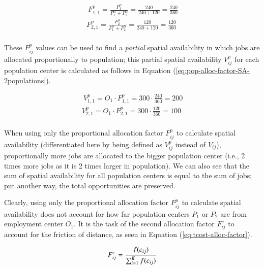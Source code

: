 \documentclass[]{elsarticle} %
\begin{document}
\begin{equation}
\label{eq:pop-alloc-factor-2populations}
\begin{array}{l}\
F^p_{1,1} = \frac{P_1 ^\alpha}{P_1^\alpha + P_2^\alpha} = \frac{240}{240 + 120} = \frac{240}{360}\\
F^p_{2,1} = \frac{P_2^\alpha}{P_1^\alpha + P_2^\alpha}  = \frac{120}{240 + 120} = \frac{120}{360}\\
\end{array}
\end{equation}

These \(F^p_{ij}\) values can be used to find a \emph{partial} spatial
availability in which jobs are allocated proportionally to population;
this partial spatial availability \(V^p_{ij}\) for each population
center is calculated as follows in Equation
(\ref{eq:pop-alloc-factor-SA-2populations}).

\begin{equation}
\label{eq:pop-alloc-factor-SA-2populations}
\begin{array}{l}\
V^p_{1,1} = O_1 \cdot F^p_{1,1} = 300 \cdot \frac{240}{360} = 200 \\
V^p_{2,1} = O_1 \cdot F^p_{2,1} = 300 \cdot \frac{120}{360} = 100 \\
\end{array}
\end{equation}

When using only the proportional allocation factor \(F^p_{ij}\) to
calculate spatial availability (differentiated here by being defined as
\(V^p_{ij}\) instead of \(V_{ij}\)), proportionally more jobs are
allocated to the bigger population center (i.e., 2 times more jobs as it
is 2 times larger in population). We can also see that the sum of
spatial availability for all population centers is equal to the sum of
jobs; put another way, the total opportunities are preserved.

Clearly, using only the proportional allocation factor \(F^p_{ij}\) to
calculate spatial availability does not account for how far population
centers \(P_1\) or \(P_2\) are from employment center \(O_1\). It is the
task of the second allocation factor \(F^c_{ij}\) to account for the
friction of distance, as seen in Equation (\ref{eq:tcost-alloc-factor}).

\begin{equation}
\label{eq:tcost-alloc-factor}
F^c_{ij} = \frac{f(c_{ij})}{\sum_{i=1}^K f(c_{ij})}\\
\end{equation}
\end{document}
